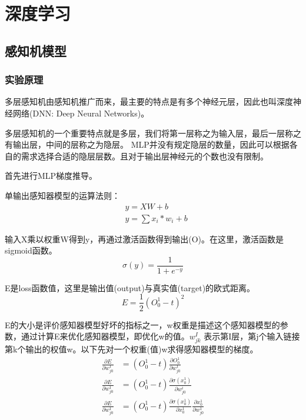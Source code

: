 \documentclass{ctexart}
\begin{document}
\section{\hei 深度学习}
\subsection{\hei 感知机模型}
\subsubsection{\hei 实验原理}
多层感知机由感知机推广而来，最主要的特点是有多个神经元层，因此也叫深度神经网络(DNN: Deep Neural Networks)。
\par 多层感知机的一个重要特点就是多层，我们将第一层称之为输入层，最后一层称之有输出层，中间的层称之为隐层。
MLP并没有规定隐层的数量，因此可以根据各自的需求选择合适的隐层层数。且对于输出层神经元的个数也没有限制。
\par 首先进行MLP梯度推导。
\par 单输出感知器模型的运算法则：
\begin{equation}
    \begin{aligned}
         & y=X W+b                \\
         & y=\sum x_{i} * w_{i}+b
    \end{aligned}
\end{equation}
\par 输入X乘以权重W得到y，再通过激活函数得到输出(O)。在这里，激活函数是sigmoid函数。
\begin{equation}
    \sigma(y)=\frac{1}{1+e^{-y}}
\end{equation}
\par E是loss函数值，这里是输出值(output)与真实值(target)的欧式距离。
\begin{equation}
    E=\frac{1}{2}\left(O_{0}^{1}-t\right)^{2}
\end{equation}
\par E的大小是评价感知器模型好坏的指标之一，w权重是描述这个感知器模型的参数，通过计算E来优化感知器模型，即优化w的值。$w_{j k}^{I}$
表示第I层，第j个输入链接第k个输出的权值w。以下先对一个权重(值)w求得感知器模型的梯度。
\begin{equation}
    \begin{aligned}
        \frac{\partial E}{\partial w_{j 0}^{1}} & =\left(O_{0}^{1}-t\right) \frac{\partial O_{0}^{1}}{\partial w_{j 0}^{1}}                                                                  \\
        \frac{\partial E}{\partial w_{j 0}^{1}} & =\left(O_{0}^{1}-t\right) \frac{\partial \sigma\left(x_{0}^{1}\right)}{\partial w_{j 0}^{i}}                                               \\
        \frac{\partial E}{\partial w_{j 0}^{1}} & =\left(O_{0}^{1}-t\right) \frac{\partial \sigma\left(x_{0}^{1}\right)}{\partial x_{0}^{1}} \frac{\partial x_{0}^{1}}{\partial w_{j 0}^{1}}
    \end{aligned}
\end{equation}
\end{document}
